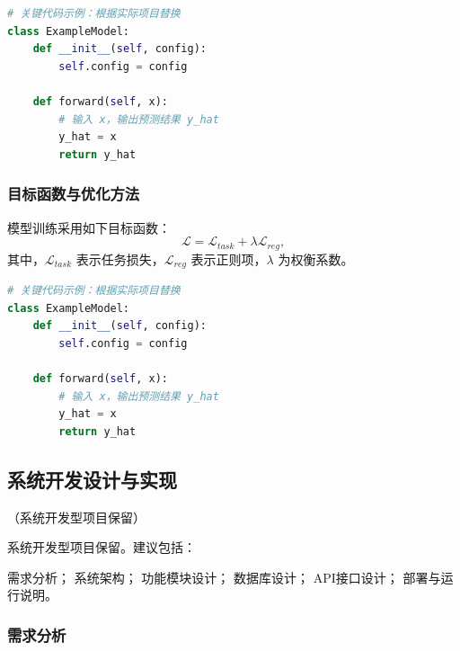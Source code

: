 \documentclass{style/course-report}
\begin{document}

\begin{lstlisting}[language=Python]
# 关键代码示例：根据实际项目替换
class ExampleModel:
    def __init__(self, config):
        self.config = config

    def forward(self, x):
        # 输入 x，输出预测结果 y_hat
        y_hat = x
        return y_hat
\end{lstlisting}

\subsubsection{目标函数与优化方法}

模型训练采用如下目标函数：
\begin{equation}
    \mathcal{L}=\mathcal{L}_{task}+\lambda\mathcal{L}_{reg},
    \label{eq:loss}
\end{equation}
其中，$\mathcal{L}_{task}$ 表示任务损失，$\mathcal{L}_{reg}$ 表示正则项，$\lambda$ 为权衡系数。


\begin{lstlisting}[language=Python]
# 关键代码示例：根据实际项目替换
class ExampleModel:
    def __init__(self, config):
        self.config = config

    def forward(self, x):
        # 输入 x，输出预测结果 y_hat
        y_hat = x
        return y_hat
\end{lstlisting}

\subsection{系统开发设计与实现}

（系统开发型项目保留）

系统开发型项目保留。建议包括：

需求分析；
系统架构；
功能模块设计；
数据库设计；
API接口设计；
部署与运行说明。

\subsubsection{需求分析}
\end{document}
